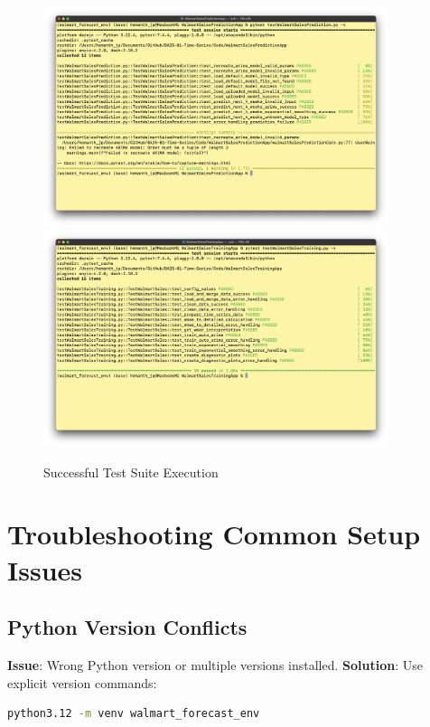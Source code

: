 \begin{figure}[H]
    \centering
   \includegraphics[width=0.9\textwidth]{Images/02InstallationAndSetup/PredictAppTest.png}
   \includegraphics[width=0.9\textwidth]{Images/02InstallationAndSetup/TrainAppTest.png}
    \caption{Successful Test Suite Execution}
    \label{fig:test_results}
\end{figure}

\section{Troubleshooting Common Setup Issues}

\subsection{Python Version Conflicts}

\textbf{Issue}: Wrong Python version or multiple versions installed.
\textbf{Solution}: Use explicit version commands:
\begin{lstlisting}[language=bash]
python3.12 -m venv walmart_forecast_env
\end{lstlisting}

